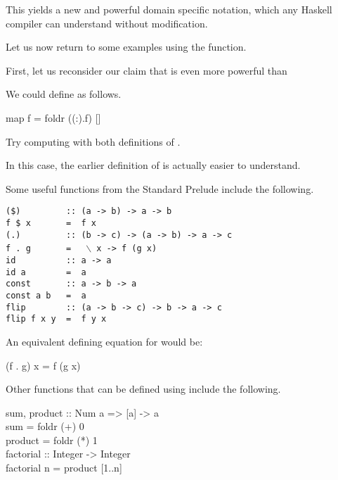 \documentclass{seminar}
\begin{document}
\begin{slide}
This yields a new and powerful domain specific notation, which any Haskell
compiler can understand without modification.

\newslide

Let us now return to some examples using the  function.

First, let us reconsider our claim that  is even more
powerful than 

We could define  as follows.

\begin{code}
map f = foldr ((:).f) []
\end{code}

Try computing  with both definitions of
.

In this case, the earlier definition of  is actually easier
to understand.

\newslide

Some useful functions from the Standard Prelude include the following.
\begin{codenott}
\texttt{(\$)~~~~~~~~~::~(a~->~b)~->~a~->~b}\\
\texttt{f~\$~x~~~~~~~=~~f~x}\\[1.5ex]

\texttt{(.)~~~~~~~~~::~(b~->~c)~->~(a~->~b)~->~a~->~c}\\
\texttt{f~.~g~~~~~~~=~}~~$\backslash$~\texttt{x~->~f~(g~x)}\\[1.5ex]

\texttt{id~~~~~~~~~~::~a~->~a}\\
\texttt{id a~~~~~~~~=~~a}\\[1.5ex]

\texttt{const~~~~~~~::~a~->~b~->~a}\\
\texttt{const a b~~~=~~a}\\[1.5ex]

\texttt{flip~~~~~~~~::~(a~->~b~->~c)~->~b~->~a~->~c}\\
\texttt{flip~f~x~y~~=~~f~y~x}
\end{codenott}

An equivalent defining equation for  would be:
\begin{code}
(f . g) x = f (g x)
\end{code}

\newslide

Other functions that can be defined using 
include the following.
\begin{code}
sum, product :: Num a => [a] -> a\\
sum = foldr (+) 0\\
product = foldr (*) 1\\
factorial :: Integer -> Integer\\
factorial n = product [1..n]
\end{code}


\end{slide}
\end{document}
